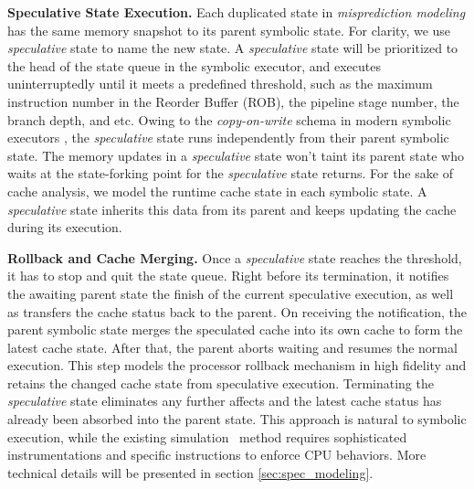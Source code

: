 \documentclass[sigconf]{acmart}
\newcommand\ignore[1]{}
\begin{document}
\ignore{
However, different program inputs might go through various program paths to reach 
a same branch point but trigger divergent decisions. Thus, in practice speculative 
executions at these points do exist and our method complies with the fact.
}


\textbf{Speculative State Execution.}
Each duplicated state in \textit{misprediction modeling} has the same 
memory snapshot to its parent symbolic state. For clarity, we use 
\textit{speculative} state to name the new state. A \textit{speculative} 
state will be prioritized to the head of the state queue in the symbolic 
executor, and executes uninterruptedly until it meets a predefined threshold, 
such as the maximum instruction number in the Reorder Buffer (ROB), the 
pipeline stage number, the branch depth, and etc. Owing to the 
\textit{copy-on-write} schema in modern symbolic executors
\cite{CadarDE08,CiorteaZBCC09}, the \textit{speculative} state runs 
independently from their parent symbolic state. The memory updates in a 
\textit{speculative} state won't taint its parent state who waits at the 
state-forking point for the \textit{speculative} state returns. For the 
sake of cache analysis, we model the runtime cache state in each symbolic 
state. A \textit{speculative} state inherits this data from its parent 
and keeps updating the cache during its execution.


\textbf{Rollback and Cache Merging.}
Once a \textit{speculative} state reaches the threshold, it has to 
stop and quit the state queue. Right before its termination, it 
notifies the awaiting parent state the finish of the current speculative execution, 
as well as transfers the cache status back to the parent. On 
receiving the notification, the parent symbolic state merges the 
speculated cache into its own cache to form the latest cache state. After 
that, the parent aborts waiting and resumes the normal execution.
This step models the processor rollback mechanism in high fidelity
and retains the changed cache state from speculative execution. 
Terminating the \textit{speculative} state eliminates any further 
affects and the latest cache status has already been absorbed 
into the parent state. This approach is natural to symbolic execution, 
while the existing simulation~\cite{OleksenkoTSF19} method requires 
sophisticated instrumentations and specific instructions to enforce 
CPU behaviors. More technical details will be presented in section
\ref{sec:spec_modeling}.

\ignore{
Our modeling approach is sound and elegant. Focusing on the worst 
case predication, we avoid missing any speculated branch that may 
cause leaks. 
}
\end{document}
